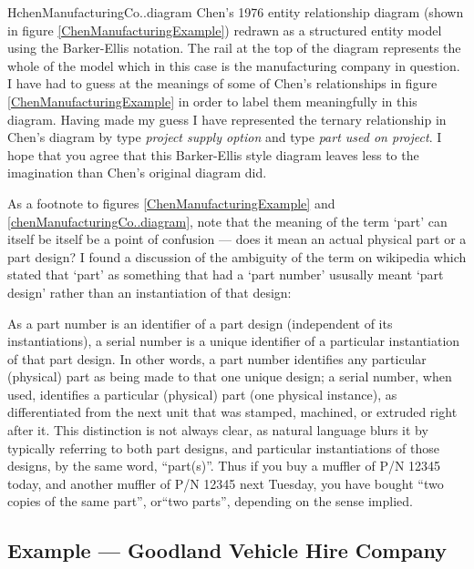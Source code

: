 \begin{erboxedFigure} {H}{chenManufacturingCo..diagram}{
Chen's 1976 entity relationship diagram (shown in figure \ref{ChenManufacturingExample}) 
redrawn as a structured entity model using the Barker-Ellis notation. 
 The rail at the top of the diagram represents the whole of the model which in this case is the manufacturing company in question.
I have had to guess at the meanings of some of Chen's relationships in figure \ref{ChenManufacturingExample}
 in order to label them meaningfully in this diagram. 
Having made my guess I have represented  the ternary relationship in Chen's diagram by type \textit{project supply option} and type \textit{part used on project}. 
I hope that you agree that this Barker-Ellis style diagram leaves less to the imagination than Chen's original diagram did.
}
\scalebox{0.95}{}
\end{erboxedFigure}
As a footnote to figures \ref{ChenManufacturingExample} and \ref{chenManufacturingCo..diagram}, 
note that the  meaning of the term  `part' can itself be itself be a point of confusion ---
does it mean an actual physical part or  a part design?
I found a discussion of the ambiguity of the term  on wikipedia which stated that `part' as something that had a `part number' ususally meant `part design' rather than an instantiation of that design:
\begin{erquote}
As a part number is an identifier of a part design (independent of its instantiations), a serial number is a unique identifier of a particular instantiation of that part design. In other words, a part number identifies any particular (physical) part as being made to that one unique design; a serial number, when used, identifies a particular (physical) part (one physical instance), as differentiated from the next unit that was stamped, machined, or extruded right after it. This distinction is not always clear, as natural language blurs it by typically referring to both part designs, and particular instantiations of those designs, by the same word, ``part(s)''. Thus if you buy a muffler of P/N 12345 today, and another muffler of P/N 12345 next Tuesday, you have bought ``two copies of the same part'', or``two parts'', depending on the sense implied.
\end{erquote}

\subsection{Example --- Goodland Vehicle Hire Company}
\label{GoodlandVehicleHireCompany}

